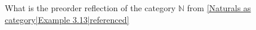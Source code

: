 
What is the preorder reflection of the category $\mathbb{N}$ from \ref{Naturals as category|Example 3.13|referenced}